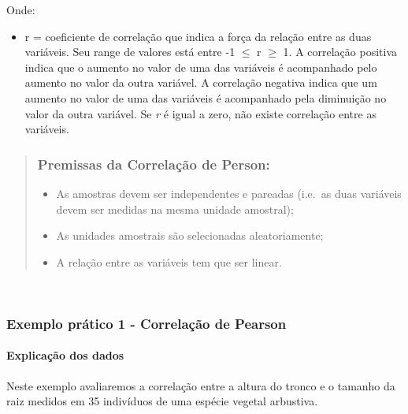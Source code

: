\documentclass[
]{book}
\providecommand{\tightlist}{%
  \setlength{\itemsep}{0pt}\setlength{\parskip}{0pt}}
\begin{document}
Onde:

\begin{itemize}
\tightlist
\item
  r = coeficiente de correlação que indica a força da relação entre as duas variáveis. Seu range de valores está entre -1 \(\leq\) r \(\geq\) 1. A correlação positiva indica que o aumento no valor de uma das variáveis é acompanhado pelo aumento no valor da outra variável. A correlação negativa indica que um aumento no valor de uma das variáveis é acompanhado pela diminuição no valor da outra variável. Se \emph{r} é igual a zero, não existe correlação entre as variáveis.
\end{itemize}

\begin{quote}
\hypertarget{premissas-da-correlauxe7uxe3o-de-person}{%
\subsubsection{Premissas da Correlação de Person:}\label{premissas-da-correlauxe7uxe3o-de-person}}

\begin{itemize}
\tightlist
\item
  As amostras devem ser independentes e pareadas (i.e.~as duas variáveis devem ser medidas na mesma unidade amostral);
\item
  As unidades amostrais são selecionadas aleatoriamente;
\item
  A relação entre as variáveis tem que ser linear.
\end{itemize}
\end{quote}

~

\hypertarget{exemplo-pruxe1tico-1---correlauxe7uxe3o-de-pearson}{%
\subsubsection{Exemplo prático 1 - Correlação de Pearson}\label{exemplo-pruxe1tico-1---correlauxe7uxe3o-de-pearson}}

\hypertarget{explicauxe7uxe3o-dos-dados-3}{%
\paragraph{Explicação dos dados}\label{explicauxe7uxe3o-dos-dados-3}}

Neste exemplo avaliaremos a correlação entre a altura do tronco e o tamanho da raiz medidos em 35 indivíduos de uma espécie vegetal arbustiva.
\end{document}
